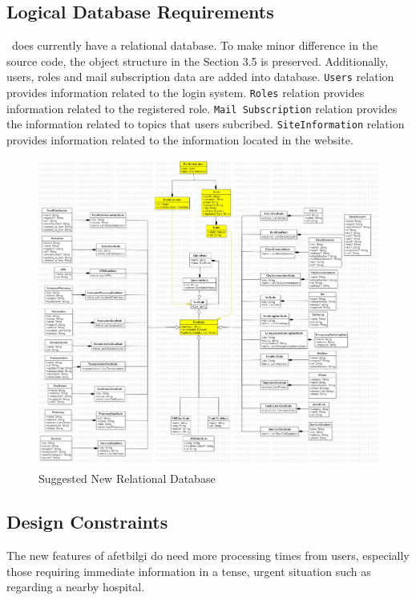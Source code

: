 \subsection{Logical Database Requirements}

\afetbilgi\ does currently have a relational database. To make minor difference in the source code, the object structure in the Section 3.5 is preserved. Additionally, users, roles and mail subscription data are added into database. \texttt{Users} relation provides information related to the login system. \texttt{Roles} relation provides information related to the registered role. \texttt{Mail Subscription} relation provides the information related to topics that users subcribed. \texttt{SiteInformation} relation provides information related to the information located in the website.

\begin{figure}[H]
  \centering
  \includegraphics[width=\linewidth]{img/database-s4.jpg}
  \caption{Suggested New Relational Database}
\end{figure}

\subsection{Design Constraints}

The new features of afetbilgi do need more processing times from users, especially those requiring immediate information in a tense, urgent situation such as regarding a nearby hospital. 

